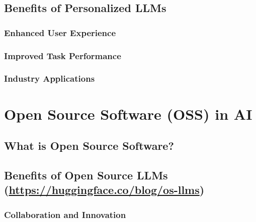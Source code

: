\documentclass[
]{book}
\begin{document}
\hypertarget{benefits-of-personalized-llms}{%
\section{Benefits of Personalized LLMs}\label{benefits-of-personalized-llms}}

\hypertarget{enhanced-user-experience}{%
\subsection{Enhanced User Experience}\label{enhanced-user-experience}}

\hypertarget{improved-task-performance}{%
\subsection{Improved Task Performance}\label{improved-task-performance}}

\hypertarget{industry-applications}{%
\subsection{Industry Applications}\label{industry-applications}}

\hypertarget{open-source-software-oss-in-ai}{%
\chapter{Open Source Software (OSS) in AI}\label{open-source-software-oss-in-ai}}

\hypertarget{what-is-open-source-software}{%
\section{What is Open Source Software?}\label{what-is-open-source-software}}

\hypertarget{benefits-of-open-source-llms-httpshuggingface.coblogos-llms}{%
\section{\texorpdfstring{Benefits of Open Source LLMs (\url{https://huggingface.co/blog/os-llms})}{Benefits of Open Source LLMs (https://huggingface.co/blog/os-llms)}}\label{benefits-of-open-source-llms-httpshuggingface.coblogos-llms}}

\hypertarget{collaboration-and-innovation}{%
\subsection{Collaboration and Innovation}\label{collaboration-and-innovation}}
\end{document}
